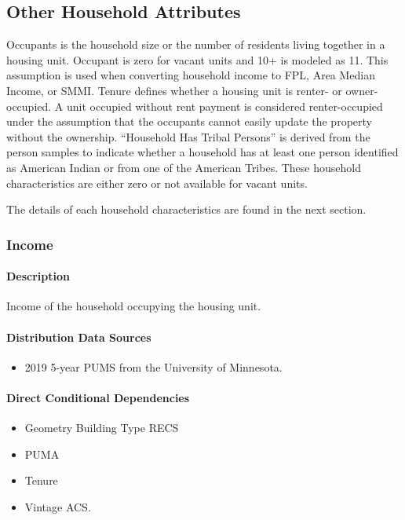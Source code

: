\subsection{Other Household Attributes}
Occupants is the household size or the number of residents living together in a housing unit. Occupant is zero for vacant units and 10+ is modeled as 11. This assumption is used when converting household income to FPL, Area Median Income, or SMMI. Tenure defines whether a housing unit is renter- or owner-occupied. A unit occupied without rent payment is considered renter-occupied under the assumption that the occupants cannot easily update the property without the ownership. ``Household Has Tribal Persons'' is derived from the person samples to indicate whether a household has at least one person identified as American Indian or from one of the American Tribes. These household characteristics are either zero or not available for vacant units.

The details of each household characteristics are found in the next section.

\subsubsection{Income}\label{income}
\paragraph{Description}
Income of the household occupying the housing unit.

\paragraph{Distribution Data Sources}
\begin{itemize}
\item
  2019 5-year PUMS from the University of Minnesota.
\end{itemize}

\paragraph{Direct Conditional Dependencies}
\begin{itemize}
    \item Geometry Building Type RECS
    \item PUMA
    \item Tenure
    \item Vintage ACS.
\end{itemize}

